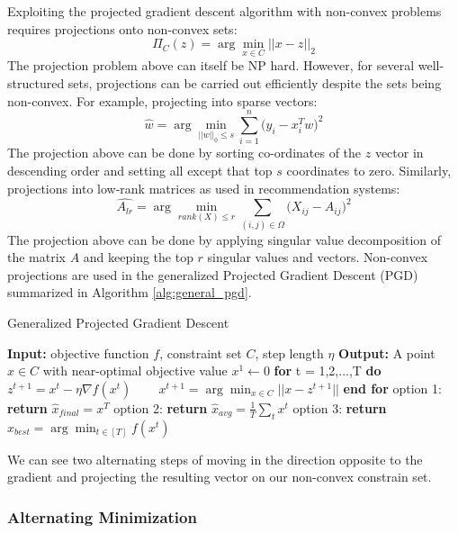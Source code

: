 Exploiting the projected gradient descent algorithm with non-convex problems requires projections onto non-convex sets:
\begin{equation}
    \Pi_{C}(z) = \arg \min_{x \in C} ||x-z||_2
\end{equation}
The projection problem above can itself be NP hard. However, for several well-structured sets, projections can be carried out efficiently despite the sets being non-convex. For example, projecting into sparse vectors:
\begin{equation}
    \hat{w} = \arg \min_{||w||_0 \leq s} \sum_{i=1}^{n}\big(y_i - x_{i}^{T}w \big)^{2}
\end{equation}
The projection above can be done by sorting co-ordinates of the $z$ vector in descending order and setting all except that top $s$ coordinates to zero. Similarly, projections into low-rank matrices as used in recommendation systems:
\begin{equation}
    \hat{A_{lr}} = \arg \min_{rank(X) \leq r}\sum_{(i,j)\in \Omega}\big(X_{ij} - A_{ij}\big)^{2}
\end{equation}
The projection above can be done by applying singular value decomposition of the matrix $A$ and keeping the top $r$ singular values and vectors. Non-convex projections are used in the generalized Projected Gradient Descent (PGD) summarized in Algorithm \ref{alg:general_pgd}.

\begin{algorithm}
\caption{Generalized Projected Gradient Descent}
\label{alg:general_pgd}
\begin{algorithmic}[1]
\STATE \textbf{Input:} objective function $f$, constraint set $C$, step length $\eta$
\STATE \textbf{Output:} A point $\hat{x} \in C$ with near-optimal objective value
\STATE $x^{1} \leftarrow 0$
\STATE \textbf{for} t = 1,2,...,T \textbf{do}
\STATE ~~~ $z^{t+1} = x^{t} - \eta \nabla f(x^{t})$
\STATE ~~~ $x^{t+1} = \arg \min_{x \in C}||x - z^{t+1}||$
\STATE \textbf{end for}
\STATE option 1: \textbf{return} $\hat{x}_{final} = x^{T}$
\STATE option 2: \textbf{return} $\hat{x}_{avg} = \frac{1}{T}\sum_t x^{t}$
\STATE option 3: \textbf{return} $\hat{x}_{best} = \arg \min_{t \in [T]} f(x^{t})$
\end{algorithmic}
\end{algorithm}
We can see two alternating steps of moving in the direction opposite to the gradient and projecting the resulting vector on our non-convex constrain set. 

\subsubsection{Alternating Minimization}

